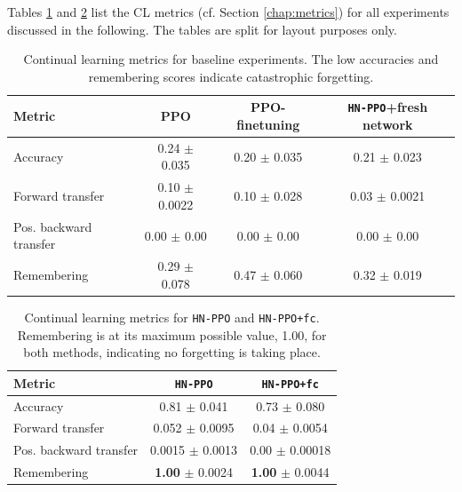 \documentclass[dvipsnames]{article} %
\newcommand{\comment}[1]{}
\newcommand{\jh}[1] {\comment{{\color{RawSienna} JH: #1}}}           %
\begin{document}
Tables \ref{tab:cl-metrics-baselines} and \ref{tab:cl-metrics-cl} list the CL metrics (cf. Section \ref{chap:metrics}) for all experiments discussed in the following. The tables are split for layout purposes only. 

\begin{table}[tb]
\caption{Continual learning metrics for baseline experiments. The low accuracies and remembering scores indicate catastrophic forgetting. \jh{What do you think about booktabs style like this?}}
\label{tab:cl-metrics-baselines}
\begin{center}
\begin{tabular}{@{}lccc@{}}
\toprule
Metric & PPO & PPO-finetuning & \texttt{HN-PPO}+fresh network \\
\midrule
Accuracy               & 0.24 $\pm$ 0.035 & 0.20 $\pm$ 0.035 & 0.21 $\pm$ 0.023 \\
Forward transfer       & 0.10 $\pm$ 0.0022& 0.10 $\pm$ 0.028 & 0.03 $\pm$ 0.0021 \\
Pos. backward transfer & 0.00 $\pm$ 0.00  & 0.00 $\pm$ 0.00  & 0.00 $\pm$ 0.00 \\
Remembering            & 0.29 $\pm$ 0.078 & 0.47 $\pm$ 0.060 & 0.32 $\pm$ 0.019 \\
\bottomrule
\end{tabular}
\end{center}
\end{table}

\begin{table}[tb]
\caption{Continual learning metrics for \texttt{HN-PPO} and \texttt{HN-PPO+fc}. Remembering is at its maximum possible value, 1.00, for both methods, indicating no forgetting is taking place.}
\label{tab:cl-metrics-cl}
\begin{center}
\begin{tabular}{@{}lcc@{}}
\toprule
Metric & \texttt{HN-PPO} & \texttt{HN-PPO+fc} \\ 
\midrule
Accuracy               &  0.81 $\pm$ 0.041 & 0.73 $\pm$ 0.080\\
Forward transfer       &  0.052 $\pm$ 0.0095 & 0.04 $\pm$ 0.0054\\
Pos. backward transfer &  0.0015 $\pm$ 0.0013 & 0.00 $\pm$ 0.00018\\
Remembering            &  \textbf{1.00} $\pm$ 0.0024 & \textbf{1.00} $\pm$ 0.0044\\
\bottomrule
\end{tabular}
\end{center}
\end{table}
\end{document}
